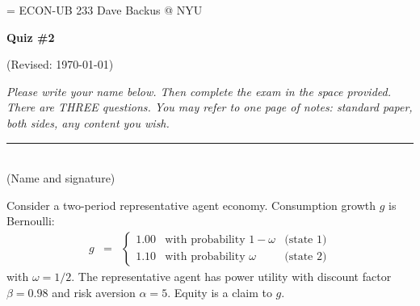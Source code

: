 \documentclass[11pt]{exam}
\begin{document}
\parskip=\bigskipamount
\parindent=0.0in
\thispagestyle{empty}
{\large ECON-UB 233 \hfill Dave Backus @ NYU}

\bigskip\bigskip
\centerline{\Large \bf Quiz \#2}
\centerline{(Revised: \today)}

\bigskip
{\it Please write your name below.
Then complete the exam in the space provided.
There are THREE questions.
You may refer to one page of notes:
standard paper, both sides, any content you wish.}

\bigskip
\begin{flushleft}
\rule{4in}{0.5pt} \\ (Name and signature)
\end{flushleft}

\begin{questions}
Consider a two-period representative agent economy.
Consumption growth $g$ is Bernoulli:
\begin{eqnarray*}
    g &=&
        \left\{
        \begin{array}{lll}
            1.00    &  \mbox{with probability } 1-\omega & \mbox{(state 1)} \\
            1.10    &  \mbox{with probability } \omega   & \mbox{(state 2)}
        \end{array}
        \right.
\end{eqnarray*}
with $\omega = 1/2$.
The representative agent has power utility with discount factor $\beta = 0.98$
and risk aversion $\alpha = 5$.
Equity is a claim to $g$.

\end{questions}
\end{document}
